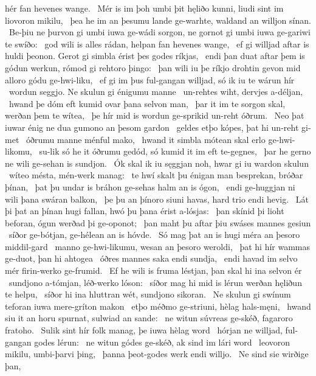 hér fan hevenes wange. \hld\ Mér is im þoh umbi þit hęliðo kunni,
liudi sint im liovoron mikilu, \hld\ þea he im an þesumu lande ge-warhte,
waldand an willjon sínan. \hld\ Be-þiu ne þurvon gi umbi iuwa ge-wádi sorgon,
ne gornot gi umbi iuwa ge-gariwi te swíðo: \hld\ god wili is alles rádan,
helpan fan hevenes wange, \hld\ ef gi willjad aftar is huldi þeonon.
Gerot gi simbla érist þes godes ríkjas, \hld\ endi þan duat aftar þem is gódun werkun,
rómod gi rehtoro þingo: \hld\ þan wili iu þe ríkjo drohtin
gevon mid alloro gódu ge-hwi-liku, \hld\ ef gi im þus ful-gangan willjad,
só ik iu te wárun hír \hld\ wordun seggjo.
Ne skulun gi énigumu manne \hld\ un-rehtes wiht,
dervjes a-déljan, \hld\ hwand þe dóm eft kumid
ovar þana selvon man, \hld\ þar it im te sorgon skal,
werðan þem te wítea, \hld\ þe hír mid is wordun ge-sprikid
un-reht óðrum. \hld\ Neo þat iuwar énig ne dua
gumono an þesom gardon \hld\ geldes etþo kópes,
þat hi un-reht gi-met \hld\ óðrumu manne
ménful mako, \hld\ hwand it simbla mótean skal
erlo ge-hwi-likomu, \hld\ su-lik só he it óðrumu gedód,
só kumid it im eft te-gegnes, \hld\ þar he gerno ne wili
ge-sehan is sundjon. \hld\ Ók skal ik iu sęggjan noh,
hwar gi iu wardon skulun \hld\ wíteo mésta,
mén-werk manag: \hld\ te hwí skalt þu énigan man besprekan,
bróðar þínan, \hld\ þat þu undar is bráhon ge-sehas
halm an is ógon, \hld\ endi ge-huggjan ni wili
þana swáran balkon, \hld\ þe þu an þínoro siuni havas,
hard trio endi hevig. \hld\ Lát þi þat an þínan hugi fallan,
hwó þu þana érist a-lósjas: \hld\ þan skínid þi lioht beforan,
ógun werðad þi ge-oponot; \hld\ þan maht þu aftar þiu
swáses mannes gesiun \hld\ síðor ge-bótjan,
ge-hélean an is hóvde. \hld\ Só mag þat an is hugi méra
an þesoro middil-gard \hld\ manno ge-hwi-likumu,
wesan an þesoro weroldi, \hld\ þat hi hír wammas ge-duot,
þan hi ahtogea \hld\ óðres mannes
saka endi sundja, \hld\ endi havad im selvo mér
firin-werko ge-frumid. \hld\ Ef he wili is fruma léstjan,
þan skal hi ina selvon ér \hld\ sundjono a-tómjan,
léð-werko lóson: \hld\ síðor mag hi mid is lérun werðan
hęliðun te helpu, \hld\ síðor hi ina hluttran wét,
sundjono sikoran. \hld\ Ne skulun gi swínum teforan
iuwa mere-gríton makon \hld\ etþo méðmo ge-striuni,
hèlag hals-męni, \hld\ hwand siu it an horu spurnat,
sulwiad an sande: \hld\ ne witun súvreas ge-skéð,
fagaroro fratoho. \hld\ Sulik sint hír folk manag,
þe iuwa hèlag word \hld\ hórjan ne willjad,
ful-gangan godes lérun: \hld\ ne witun gódes ge-skéð,
ak sind im lári word \hld\ leovoron mikilu,
umbi-þarvi þing, \hld\ þanna þeot-godes
werk endi willjo. \hld\ Ne sind sie wirðige þan,
